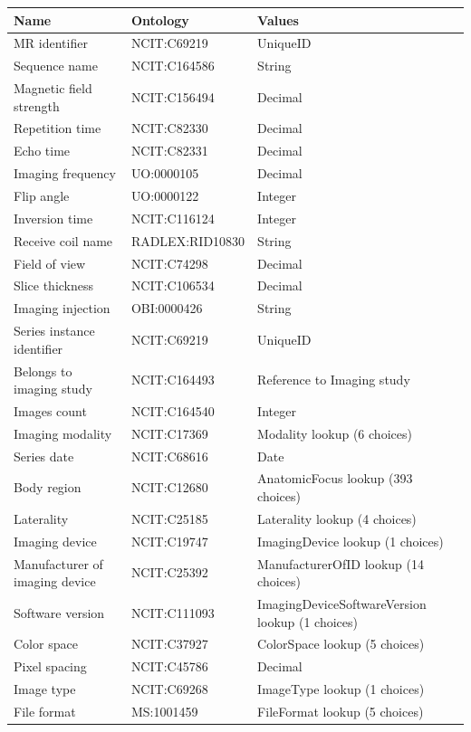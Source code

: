 \documentclass{article}
\begin{document}
\begin{table}[htb]
\begin{tabular}{lll}
Name & Ontology & Values \\
\hline
MR identifier & NCIT:C69219 & UniqueID \\
Sequence name & NCIT:C164586 & String \\
Magnetic field strength & NCIT:C156494 & Decimal \\
Repetition time & NCIT:C82330 & Decimal \\
Echo time & NCIT:C82331 & Decimal \\
Imaging frequency & UO:0000105 & Decimal \\
Flip angle & UO:0000122 & Integer \\
Inversion time & NCIT:C116124 & Integer \\
Receive coil name & RADLEX:RID10830 & String \\
Field of view & NCIT:C74298 & Decimal \\
Slice thickness & NCIT:C106534 & Decimal \\
Imaging injection & OBI:0000426 & String \\
Series instance identifier & NCIT:C69219 & UniqueID \\
Belongs to imaging study & NCIT:C164493 & Reference to Imaging study \\
Images count & NCIT:C164540 & Integer \\
Imaging modality & NCIT:C17369 & Modality lookup (6 choices) \\
Series date & NCIT:C68616 & Date \\
Body region & NCIT:C12680 & AnatomicFocus lookup (393 choices) \\
Laterality & NCIT:C25185 & Laterality lookup (4 choices) \\
Imaging device & NCIT:C19747 & ImagingDevice lookup (1 choices) \\
Manufacturer of imaging device & NCIT:C25392 & ManufacturerOfID lookup (14 choices) \\
Software version & NCIT:C111093 & ImagingDeviceSoftwareVersion lookup (1 choices) \\
Color space & NCIT:C37927 & ColorSpace lookup (5 choices) \\
Pixel spacing & NCIT:C45786 & Decimal \\
Image type & NCIT:C69268 & ImageType lookup (1 choices) \\
File format & MS:1001459 & FileFormat lookup (5 choices) \\

\end{tabular}
\end{table}
\end{document}
